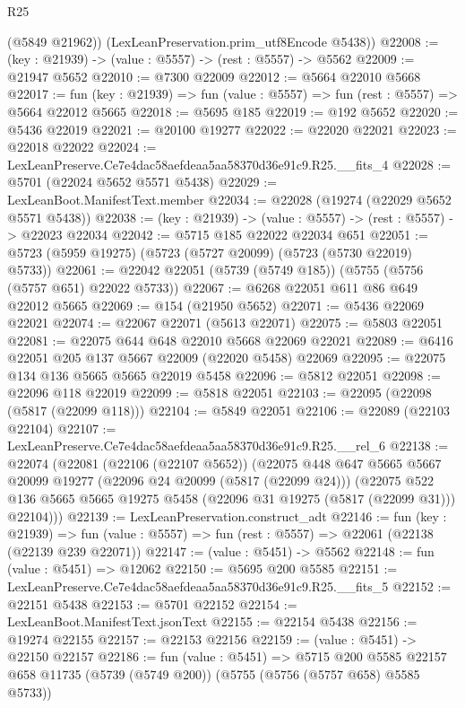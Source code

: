 \begin{lexlean}{R25}
\begin{coremodule}
        (@5849 @21962))
      (LexLeanPreservation.prim_utf8Encode @5438))
@22008 := (key : @21939) -> (value : @5557) -> (rest : @5557) -> @5562
@22009 := @21947 @5652
@22010 := @7300 @22009
@22012 := @5664 @22010 @5668
@22017 := fun (key : @21939) => fun (value : @5557) => fun (rest : @5557) => @5664 @22012 @5665
@22018 := @5695 @185
@22019 := @192 @5652
@22020 := @5436 @22019
@22021 := @20100 @19277
@22022 := @22020 @22021
@22023 := @22018 @22022
@22024 := LexLeanPreserve.Ce7e4dac58aefdeaa5aa58370d36e91c9.R25.__fits_4
@22028 := @5701 (@22024 @5652 @5571 @5438)
@22029 := LexLeanBoot.ManifestText.member
@22034 := @22028 (@19274 (@22029 @5652 @5571 @5438))
@22038 := (key : @21939) -> (value : @5557) -> (rest : @5557) -> @22023 @22034
@22042 := @5715 @185 @22022 @22034 @651
@22051 := @5723 (@5959 @19275) (@5723 (@5727 @20099) (@5723 (@5730 @22019) @5733))
@22061 := @22042 @22051 (@5739 (@5749 @185)) (@5755 (@5756 (@5757 @651) @22022 @5733))
@22067 := @6268 @22051 @611 @86 @649 @22012 @5665
@22069 := @154 (@21950 @5652)
@22071 := @5436 @22069 @22021
@22074 := @22067 @22071 (@5613 @22071)
@22075 := @5803 @22051
@22081 := @22075 @644 @648 @22010 @5668 @22069 @22021
@22089 := @6416 @22051 @205 @137 @5667 @22009 (@22020 @5458) @22069
@22095 := @22075 @134 @136 @5665 @5665 @22019 @5458
@22096 := @5812 @22051
@22098 := @22096 @118 @22019
@22099 := @5818 @22051
@22103 := @22095 (@22098 (@5817 (@22099 @118)))
@22104 := @5849 @22051
@22106 := @22089 (@22103 @22104)
@22107 := LexLeanPreserve.Ce7e4dac58aefdeaa5aa58370d36e91c9.R25.__rel_6
@22138 := @22074
    (@22081
      (@22106 (@22107 @5652))
      (@22075
        @448
        @647
        @5665
        @5667
        @20099
        @19277
        (@22096 @24 @20099 (@5817 (@22099 @24)))
        (@22075
          @522
          @136
          @5665
          @5665
          @19275
          @5458
          (@22096 @31 @19275 (@5817 (@22099 @31)))
          @22104)))
@22139 := LexLeanPreservation.construct_adt
@22146 := fun (key : @21939) =>
  fun (value : @5557) => fun (rest : @5557) => @22061 (@22138 (@22139 @239 @22071))
@22147 := (value : @5451) -> @5562
@22148 := fun (value : @5451) => @12062
@22150 := @5695 @200 @5585
@22151 := LexLeanPreserve.Ce7e4dac58aefdeaa5aa58370d36e91c9.R25.__fits_5
@22152 := @22151 @5438
@22153 := @5701 @22152
@22154 := LexLeanBoot.ManifestText.jsonText
@22155 := @22154 @5438
@22156 := @19274 @22155
@22157 := @22153 @22156
@22159 := (value : @5451) -> @22150 @22157
@22186 := fun (value : @5451) =>
  @5715
    @200
    @5585
    @22157
    @658
    @11735
    (@5739 (@5749 @200))
    (@5755 (@5756 (@5757 @658) @5585 @5733))

\end{coremodule}
\end{lexlean}
